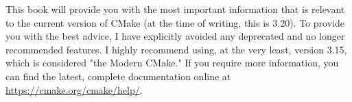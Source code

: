 \begin{tcolorbox}[colback=blue!5!white,colframe=blue!75!black,title=Getting Help]
This book will provide you with the most important information that is relevant to the current version of CMake (at the time of writing, this is 3.20). To provide you with the best advice, I have explicitly avoided any deprecated and no longer recommended features. I highly recommend using, at the very least, version 3.15, which is considered "the Modern CMake." If you require more information, you can find the latest, complete documentation online at \url{https://cmake.org/cmake/help/}.
\end{tcolorbox}




















